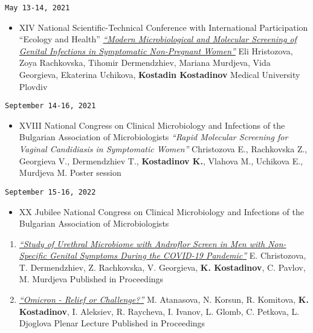 \documentclass[
  12pt,
  letterpaper,
  DIV=11,
  numbers=noendperiod]{scrartcl}
\providecommand{\tightlist}{%
  \setlength{\itemsep}{0pt}\setlength{\parskip}{0pt}}\usepackage{longtable,booktabs,array}
\begin{document}
\texttt{May\ 13-14,\ 2021}

\begin{itemize}
\tightlist
\item
  XIV National Scientific-Technical Conference with International
  Participation ``Ecology and Health'' \textbar{}
  \emph{\href{https://hst.bg/ECOLOGY\%20AND\%20HEALTH\%202021.pdf}{``Modern
  Microbiological and Molecular Screening of Genital Infections in
  Symptomatic Non-Pregnant Women''}} \textbar{} Eli Hristozova, Zoya
  Rachkovska, Tihomir Dermendzhiev, Mariana Murdjeva, Vida Georgieva,
  Ekaterina Uchikova, \textbf{Kostadin Kostadinov} \textbar{} Medical
  University Plovdiv
\end{itemize}

\texttt{September\ 14-16,\ 2021}

\begin{itemize}
\tightlist
\item
  XVIII National Congress on Clinical Microbiology and Infections of the
  Bulgarian Association of Microbiologists \textbar{} \emph{``Rapid
  Molecular Screening for Vaginal Candidiasis in Symptomatic Women''}
  \textbar{} Christozova E., Rachkovska Z., Georgieva V., Dermendzhiev
  T., \textbf{Kostadinov K.}, Vlahova M., Uchikova E., Murdjeva M.
  \textbar{} Poster session
\end{itemize}

\texttt{September\ 15-16,\ 2022}

\begin{itemize}
\tightlist
\item
  XX Jubilee National Congress on Clinical Microbiology and Infections
  of the Bulgarian Association of Microbiologists
\end{itemize}

\begin{enumerate}
\def\labelenumi{\arabic{enumi}.}
\item
  \emph{\href{https://www.bam-bg.net/images/documents/3Posters.pdf}{``Study
  of Urethral Microbiome with Androflor Screen in Men with Non-Specific
  Genital Symptoms During the COVID-19 Pandemic''}} \textbar{} E.
  Christozova, T. Dermendzhiev, Z. Rachkovska, V. Georgieva, \textbf{K.
  Kostadinov}, C. Pavlov, M. Murdjeva \textbar{} Published in
  Proceedings
\item
  \emph{\href{https://www.bam-bg.net/images/documents/2Abstracts.pdf}{``Omicron
  - Relief or Challenge?''}} \textbar{} M. Atanasova, N. Korsun, R.
  Komitova, \textbf{K. Kostadinov}, I. Aleksiev, R. Raycheva, I. Ivanov,
  L. Glomb, C. Petkova, L. Djoglova \textbar{} Plenar Lecture \textbar{}
  Published in Proceedings
\end{enumerate}
\end{document}
